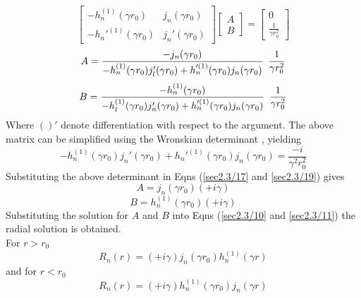 \begin{equation}
  \begin{bmatrix} -h_n^{(1)}(\gamma r_0) & j_n(\gamma r_0) \\ -h_n'^{(1)}(\gamma r_0) & j_n'(\gamma r_0)  \end{bmatrix} \left[\begin{array}{c}A \\ B \end{array}\right]= \left[\begin{array}{c}0 \\ \frac{1}{\gamma r_{0}^{2}} \end{array}\right]
\end{equation}
\begin{equation}
\label{sec2.3/17}
A = \frac{-j_{n}(\gamma r_0)}{-h_{n}^{(1)}(\gamma r_{0})j_{l}'(\gamma r_0) + h_{n}'^{(1)}(\gamma r_{0})j_{n}(\gamma r_{0})}\enskip \frac{1}{\gamma r_{0}^2 }
\end{equation}
\begin{equation}
\label{sec2.3/19}
B = \frac{-h_{n}^{(1)}(\gamma r_{0})}{-h_{l}^{(1)}(\gamma r_{0})j_{n}'(\gamma r_{0}) + h_{n}'^{(1)}(\gamma r_{0})j_{n}(\gamma r_{0})}\enskip \frac{1}{\gamma r_{0}^2 }
\end{equation}
Where $()'$ denote differentiation with respect to the argument. The above matrix can be simplified using the  Wronskian determinant \cite{wiki:xxx}, yielding
\begin{equation}
-h_{n}^{(1)}(\gamma r_0)j_{n}'(\gamma r_0) + h_{n}'^{(1)}(\gamma r_0)j_{n}(\gamma r_0) = \frac{-i}{\gamma^2r_{0}^2 }
\end{equation}
Substituting the above determinant in  Eqns  (\ref{sec2.3/17} and \ref{sec2.3/19}) gives
\begin{equation}
A = j_{n}{(\gamma r_{0})} (+i\gamma)
\end{equation}
\begin{equation}
B =h_{n}^{(1)}(\gamma r_{0}) (+i\gamma)
\end{equation}
Substituting the  solution for $A$ and $B$ into Eqns (\ref{sec2.3/10} and \ref {sec2.3/11})  the  radial solution is obtained.
\\ For $r >r_0$
\begin{equation}
\label{sec2.3/20}
R_{n}(r) = (+i\gamma)j_{n}{(\gamma r_0)}h_{n}^{(1)}(\gamma r)
\end{equation} 
and  for $r <r_0$
\begin{equation}
\label{sec2.3/22}
R_{n}(r) = (+i\gamma)h_{n}^{(1)}{(\gamma r_0)}j_{n}(\gamma r)
\end{equation} 
